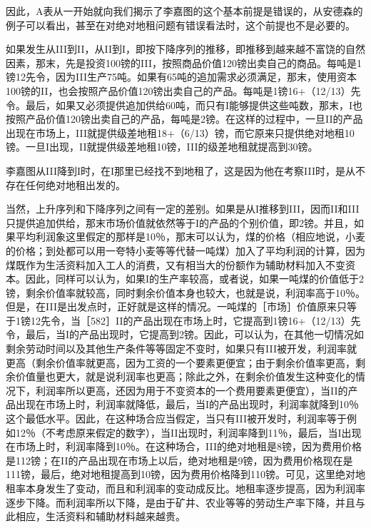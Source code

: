 因此，A表从一开始就向我们揭示了李嘉图的这个基本前提是错误的，从安德森的例子可以看出，甚至在对绝对地租问题有错误看法时，这个前提也不是必要的。

如果发生从III到II，从II到I，即按下降序列的推移，即推移到越来越不富饶的自然因素，那末，先是投资100镑的III，按照商品价值120镑出卖自己的商品。每吨是1镑12先令，因为III生产75吨。如果有65吨的追加需求必须满足，那末，使用资本100镑的II，也会按照产品价值120镑出卖自己的产品。每吨是1镑16+（12/13）先令。最后，如果又必须提供追加供给60吨，而只有I能够提供这些吨数，那末，I也按照产品价值120镑出卖自己的产品，每吨是2镑。在这样的过程中，一旦II的产品出现在市场上，III就提供级差地租18+（6/13）镑，而它原来只提供绝对地租10镑。一旦I出现，II就提供级差地租10镑，III的级差地租就提高到30镑。

李嘉图从III降到I时，在I那里已经找不到地租了，这是因为他在考察III时，是从不存在任何绝对地租出发的。

当然，上升序列和下降序列之间有一定的差别。如果是从I推移到III，因而II和III只提供追加供给，那末市场价值就依然等于I的产品的个别价值，即2镑。并且，如果平均利润象这里假定的那样是10％，那末可以认为，煤的价格（相应地说，小麦的价格；到处都可以用一夸特小麦等等代替一吨煤）加入了平均利润的计算，因为煤既作为生活资料加入工人的消费，又有相当大的份额作为辅助材料加入不变资本。因此，同样可以认为，如果I的生产率较高，或者说，如果一吨煤的价值低于2镑，剩余价值率就较高，同时剩余价值本身也较大，也就是说，利润率高于10％。但是，在III是出发点时，正好就是这样的情况。一吨煤的［市场］价值原来只等于1镑12先令，当［582］II的产品出现在市场上时，它提高到1镑16+（12/13）先令，最后，当I的产品出现时，它提高到2镑。因此，可以认为，在其他一切情况如剩余劳动时间以及其他生产条件等等固定不变时，如果只有III被开发，利润率就更高（剩余价值率就更高，因为工资的一个要素更便宜；由于剩余价值率更高，剩余价值量也更大，就是说利润率也更高；除此之外，在剩余价值发生这种变化的情况下，利润率所以更高，还因为用于不变资本的一个费用要素更便宜），当II的产品出现在市场上时，利润率就降低，最后，当I的产品出现时，利润率就降到10％这个最低水平。因此，在这种场合应当假定，当只有III被开发时，利润率等于例如12％（不考虑原来假定的数字），当II出现时，利润率降到11％，最后，当I出现在市场上时，利润率降到10％。在这种场合，III的绝对地租是8镑，因为费用价格是112镑；在II的产品出现在市场上以后，绝对地租是9镑，因为费用价格现在是111镑，最后，绝对地租提高到10镑，因为费用价格降到110镑。可见，这里绝对地租率本身发生了变动，而且和利润率的变动成反比。地租率逐步提高，因为利润率逐步下降。而利润率所以下降，是由于矿井、农业等等的劳动生产率下降，并且与此相应，生活资料和辅助材料越来越贵。


